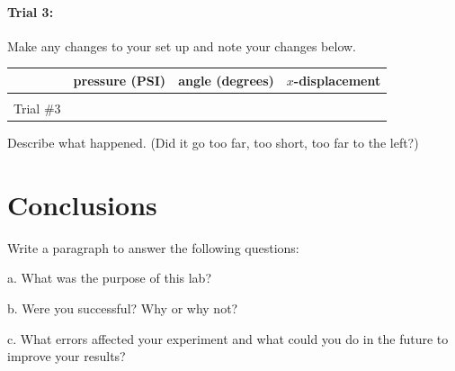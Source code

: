 \documentclass[10pt]{exam}
\begin{document}
\paragraph{Trial 3:}  Make any changes to your set up and note your changes below.

\noindent
\begin{tabular}{|*4{l|}}
  \hline
  & pressure (PSI) & angle (degrees) & $x$-displacement\\\hline
  &&& \\
  Trial \#3 &&& \\
  \hline
\end{tabular}

\noindent
Describe what happened. (Did it go too far, too short, too far to the left?)
\vspace{5em}
			
\section*{Conclusions}
Write a paragraph to answer the following questions:

a.	What was the purpose of this lab? 

b.	Were you successful?  Why or why not? 

c.	What errors affected your experiment and what could you do in the future to improve your results?
\end{document}
